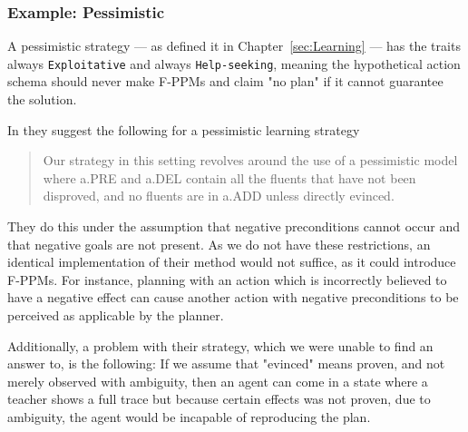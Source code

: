 \documentclass[\master/Master.tex]{subfiles}
\begin{document}
\subsubsection{Example: Pessimistic}

	A pessimistic strategy --- as defined it in Chapter~\ref{sec:Learning} --- has the traits always \texttt{Exploitative} and always \texttt{Help-seeking},
	meaning the hypothetical action schema should never make F-PPMs and claim "no plan" if it cannot guarantee the solution.

	In \cite{Walsh2008} they suggest the following for a pessimistic learning strategy
	
	\begin{quotation}
		Our strategy in
		this setting revolves around the use of a pessimistic model
		where a.PRE and a.DEL contain all the fluents that have
		not been disproved, and no fluents are in a.ADD unless directly
		evinced.
	\end{quotation}
	 
	They do this under the assumption that negative preconditions cannot occur and that negative goals are not present. As we do not have these restrictions, an identical implementation of their method would not suffice, as it could introduce F-PPMs. For instance, planning with an action which is incorrectly believed to have a negative effect can cause another action with negative preconditions to be perceived as applicable by the planner.
	
	Additionally, a problem with their strategy, which we were unable to find an answer to, is the following: If we assume that "evinced" means proven, and not merely observed with ambiguity, then an agent can come in a state where a teacher shows a full trace but because certain effects was not proven, due to ambiguity, the agent would be incapable of reproducing the plan.
	
\end{document}
